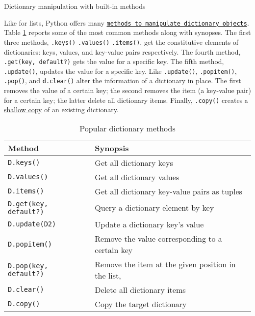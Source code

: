 \documentclass[a4paper,11pt]{book}
\numberwithin{figure}{chapter}
\numberwithin{table}{chapter}
\newcommand{\question}[1]{%
    \begin{tcolorbox}[colback=comp_c!10,colframe=comp_c,sidebyside align=top,width=\linewidth,before skip=1ex]
        #1
    \end{tcolorbox}%
    \switchcolumn%
}
\newcommand{\note}[1]{%
    \begin{tcolorbox}[colback=white!0,colframe=white!10,width=\linewidth,before skip=1ex]
        #1
    \end{tcolorbox}         
}
\begin{document}
\begin{paracol}{2}
\question{\raggedright Dictionary manipulation with built-in methods}
\note{Like for lists, Python offers many \href{https://docs.python.org/3/tutorial/datastructures.html#dictionaries}{\texttt{methods to manipulate dictionary objects}}. Table \ref{tab:dictionary_methods} reports some of the most common methods along with synopses. The first three methods, \texttt{.keys()} \texttt{.values()} \texttt{.items()}, get the constitutive elements of dictionaries: keys, values, and key-value pairs respectively. The fourth method, \texttt{.get(key, default?)} gets the value for a specific key. The fifth method, \texttt{.update()}, updates the value for a specific key. Like \texttt{.update()}, \texttt{.popitem()}, \texttt{.pop()}, and \texttt{d.clear()} alter the information of a dictionary in place. The first removes the value of a certain key; the second removes the item (a key-value pair) for a certain key; the latter delete all dictionary items. Finally, \texttt{.copy()} creates a \href{https://docs.python.org/3/library/copy.html}{shallow copy} of an existing dictionary.}
\end{paracol}

\begin{table}[!htbp]
	\caption{Popular dictionary methods}
	\label{tab:dictionary_methods}
	\centering
	\begin{tabular}{ll}
		\toprule \toprule
		Method & Synopsis \\
		\midrule 
		\texttt{D.keys()} & Get all dictionary keys\\
		\texttt{D.values()} & Get all dictionary values \\ 
		\texttt{D.items() } & Get all dictionary key-value pairs as tuples \\
		\texttt{D.get(key, default?)} & Query a dictionary element by key\\ 
		\texttt{D.update(D2) } & Update a dictionary key's value\\
		\texttt{D.popitem()} & Remove the value corresponding to a certain key \\ 
		\texttt{D.pop(key, default?) } & Remove the item at the given position in the list,\\
		\texttt{D.clear() } & Delete all dictionary items\\
		\texttt{D.copy() } & Copy the target dictionary \\
		\bottomrule 
	\end{tabular}
\end{table}
\end{document}
